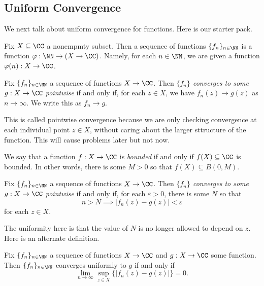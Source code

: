 \subsection{Uniform Convergence}
We next talk about uniform convergence for functions. Here is our starter pack.
\begin{definition}
	Fix $X\subseteq\CC$ a nonempmty subset. Then a sequence of functions $\{f_n\}_{n\in\NN}$ is a function $\varphi:\NN\to(X\to\CC)$. Namely, for each $n\in\NN$, we are given a function $\varphi(n):X\to\CC$.
\end{definition}
\begin{definition}
	Fix $\{f_n\}_{n\in\NN}$ a sequence of functions $X\to\CC$. Then \textit{$\{f_n\}$ converges to some $g:X\to\CC$ pointwise} if and only if, for each $z\in X$, we have $f_n(z)\to g(z)$ as $n\to\infty$. We write this as $f_n\to g$.
\end{definition}
This is called pointwise convergence because we are only checking convergence at each individual point $z\in X$, without caring about the larger sttructure of the function. This will cause problems later but not now.
\begin{definition}[Bounded]
	We say that a function $f:X\to\CC$ is \textit{bounded} if and only if $f(X)\subseteq\CC$ is bounded. In other words, there is some $M>0$ so that $f(X)\subseteq B(0,M)$.
\end{definition}
\begin{definition}
	Fix $\{f_n\}_{n\in\NN}$ a sequence of functions $X\to\CC$. Then \textit{$\{f_n\}$ converges to some $g:X\to\CC$ pointwise} if and only if, for each $\varepsilon>0$, there is some $N$ so that
	\[n>N\implies|f_n(z)-g(z)|<\varepsilon\]
	for each $z\in X$.
\end{definition}
The uniformity here is that the value of $N$ is no longer allowed to depend on $z$. Here is an alternate definition.
\begin{proposition} \label{prop:definefuncdist}
	Fix $\{f_n\}_{n\in\NN}$ a sequence of functions $X\to\CC$ and $g:X\to\CC$ some function. Then $\{f_n\}_{n\in\NN}$ converges uniformly to $g$ if and only if
	\[\lim_{n\to\infty}\sup_{z\in X}\{|f_n(z)-g(z)|\}=0.\]
\end{proposition}
